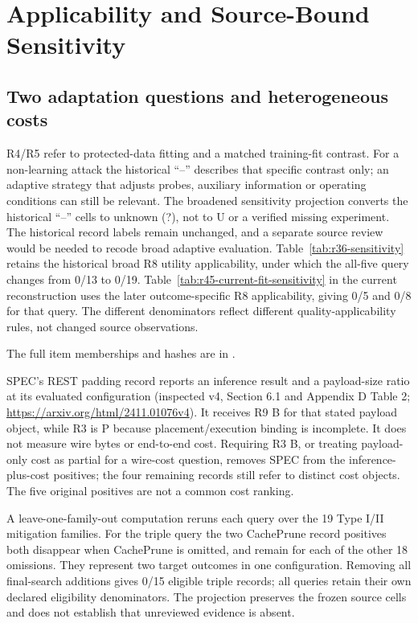 \section{Applicability and Source-Bound Sensitivity}\label{sec:r36-review}
\subsection{Two adaptation questions and heterogeneous costs}
R4/R5 refer to protected-data fitting and a matched training-fit contrast. For a non-learning attack the historical ``--'' describes that specific contrast only; an adaptive strategy that adjusts probes, auxiliary information or operating conditions can still be relevant. The broadened sensitivity projection converts the historical ``--'' cells to unknown (?), not to U or a verified missing experiment. The historical record labels remain unchanged, and a separate source review would be needed to recode broad adaptive evaluation. Table~\ref{tab:r36-sensitivity} retains the historical broad R8 utility applicability, under which the all-five query changes from 0/13 to 0/19. Table~\ref{tab:r45-current-fit-sensitivity} in the current reconstruction uses the later outcome-specific R8 applicability, giving 0/5 and 0/8 for that query. The different denominators reflect different quality-applicability rules, not changed source observations.

 The full item memberships and hashes are in .

SPEC's REST padding record reports an inference result and a payload-size ratio at its evaluated configuration (inspected v4, Section 6.1 and Appendix D Table 2; \url{https://arxiv.org/html/2411.01076v4}). It receives R9 B for that stated payload object, while R3 is P because placement/execution binding is incomplete. It does not measure wire bytes or end-to-end cost. Requiring R3 B, or treating payload-only cost as partial for a wire-cost question, removes SPEC from the inference-plus-cost positives; the four remaining records still refer to distinct cost objects. The five original positives are not a common cost ranking.

A leave-one-family-out computation reruns each query over the 19 Type I/II mitigation families. For the triple query the two CachePrune record positives both disappear when CachePrune is omitted, and remain for each of the other 18 omissions. They represent two target outcomes in one configuration. Removing all final-search additions gives 0/15 eligible triple records; all queries retain their own declared eligibility denominators. The projection preserves the frozen source cells and does not establish that unreviewed evidence is absent.

